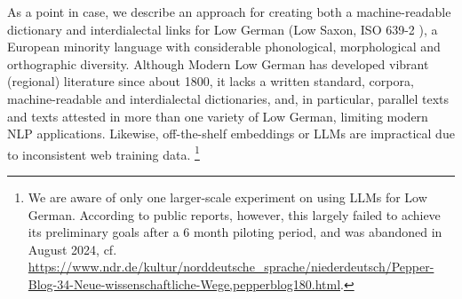 As a point in case, we describe an approach for creating both a machine-readable dictionary and interdialectal links for Low German (Low Saxon, ISO 639-2 ), a European minority language with considerable phonological, morphological and orthographic diversity. Although Modern Low German has developed vibrant (regional) literature since about 1800, it lacks a written standard, corpora, machine-readable and interdialectal dictionaries, and, in particular, parallel texts and texts attested in more than one variety of Low German, limiting modern NLP applications. Likewise, off-the-shelf embeddings or LLMs are impractical due to inconsistent web training data. \footnote{
    We are aware of only one larger-scale experiment on using LLMs for Low German. According to public reports, however, this largely failed to achieve its preliminary goals after a 6 month piloting period, and was abandoned in August 2024, cf. \url{https://www.ndr.de/kultur/norddeutsche_sprache/niederdeutsch/Pepper-Blog-34-Neue-wissenschaftliche-Wege,pepperblog180.html}.
}

